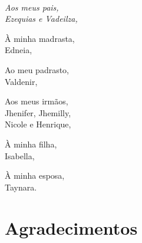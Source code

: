 \ \\
\vspace{55ex}

\begin{flushright}
\it
Aos meus pais,\\
Ezequias e Vadeilza,\\

\vspace{3ex}

À minha madrasta,\\
Edneia,\\

\vspace{3ex}

Ao meu padrasto,\\
Valdenir,\\

\vspace{3ex}

Aos meus irmãos,\\
Jhenifer, Jhemilly,\\
Nicole e Henrique,\\

\vspace{3ex}

À minha filha,\\
Isabella,\\

\vspace{3ex}

À minha esposa,\\
Taynara.
\end{flushright}



\cleardoublepage
\chapter*{Agradecimentos}






